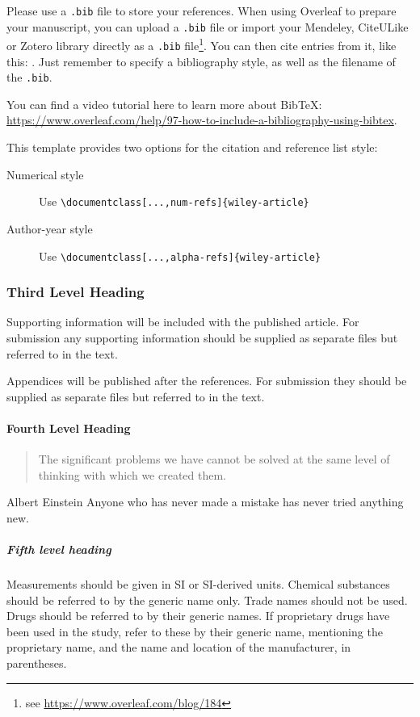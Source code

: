 \documentclass[alpha-refs]{wiley-article}
\begin{document}
Please use a \verb|.bib| file to store your references. When using Overleaf to prepare your manuscript, you can upload a \verb|.bib| file or import your Mendeley, CiteULike or Zotero library directly as a \verb|.bib| file\footnote{see \url{https://www.overleaf.com/blog/184}}. You can then cite entries from it, like this: \cite{Gregori2012}. Just remember to specify a bibliography style, as well as the filename of the \verb|.bib|.

You can find a video tutorial here to learn more about BibTeX: \url{https://www.overleaf.com/help/97-how-to-include-a-bibliography-using-bibtex}.

This template provides two options for the citation and reference list style: 
\begin{description}
\item[Numerical style] Use \verb|\documentclass[...,num-refs]{wiley-article}|
\item[Author-year style] Use \verb|\documentclass[...,alpha-refs]{wiley-article}|
\end{description}

\subsubsection{Third Level Heading}
Supporting information will be included with the published article. For submission any supporting information should be supplied as separate files but referred to in the text.

Appendices will be published after the references. For submission they should be supplied as separate files but referred to in the text.

\paragraph{Fourth Level Heading}
\begin{quote}
The significant problems we have cannot be solved at the same level of thinking with which we created them.
\end{quote}

\begin{epigraph}{Albert Einstein}
Anyone who has never made a mistake has never tried anything new.
\end{epigraph}

\subparagraph{Fifth level heading}
Measurements should be given in SI or SI-derived units.
Chemical substances should be referred to by the generic name only. Trade names should not be used. Drugs should be referred to by their generic names. If proprietary drugs have been used in the study, refer to these by their generic name, mentioning the proprietary name, and the name and location of the manufacturer, in parentheses.
\end{document}
